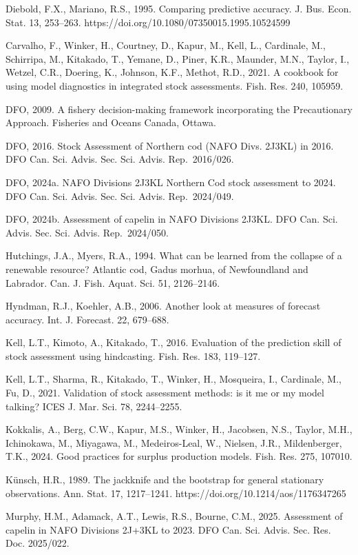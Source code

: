 \documentclass[11pt]{article}
\begin{document}
Diebold, F.X., Mariano, R.S., 1995. Comparing predictive accuracy. J.
Bus. Econ. Stat. 13, 253--263.
https://doi.org/10.1080/07350015.1995.10524599

Carvalho, F., Winker, H., Courtney, D., Kapur, M., Kell, L., Cardinale,
M., Schirripa, M., Kitakado, T., Yemane, D., Piner, K.R., Maunder, M.N.,
Taylor, I., Wetzel, C.R., Doering, K., Johnson, K.F., Methot, R.D.,
2021. A cookbook for using model diagnostics in integrated stock
assessments. Fish. Res. 240, 105959.

DFO, 2009. A fishery decision-making framework incorporating the
Precautionary Approach. Fisheries and Oceans Canada, Ottawa.

DFO, 2016. Stock Assessment of Northern cod (NAFO Divs. 2J3KL) in 2016.
DFO Can. Sci. Advis. Sec. Sci. Advis. Rep.~2016/026.

DFO, 2024a. NAFO Divisions 2J3KL Northern Cod stock assessment to 2024.
DFO Can. Sci. Advis. Sec. Sci. Advis. Rep.~2024/049.

DFO, 2024b. Assessment of capelin in NAFO Divisions 2J3KL. DFO Can. Sci.
Advis. Sec. Sci. Advis. Rep.~2024/050.

Hutchings, J.A., Myers, R.A., 1994. What can be learned from the
collapse of a renewable resource? Atlantic cod, Gadus morhua, of
Newfoundland and Labrador. Can. J. Fish. Aquat. Sci. 51, 2126--2146.

Hyndman, R.J., Koehler, A.B., 2006. Another look at measures of forecast
accuracy. Int. J. Forecast. 22, 679--688.

Kell, L.T., Kimoto, A., Kitakado, T., 2016. Evaluation of the prediction
skill of stock assessment using hindcasting. Fish. Res. 183, 119--127.

Kell, L.T., Sharma, R., Kitakado, T., Winker, H., Mosqueira, I.,
Cardinale, M., Fu, D., 2021. Validation of stock assessment methods: is
it me or my model talking? ICES J. Mar. Sci. 78, 2244--2255.

Kokkalis, A., Berg, C.W., Kapur, M.S., Winker, H., Jacobsen, N.S.,
Taylor, M.H., Ichinokawa, M., Miyagawa, M., Medeiros-Leal, W., Nielsen,
J.R., Mildenberger, T.K., 2024. Good practices for surplus production
models. Fish. Res. 275, 107010.

K\"unsch, H.R., 1989. The jackknife and the bootstrap for general
stationary observations. Ann. Stat. 17, 1217--1241.
https://doi.org/10.1214/aos/1176347265

Murphy, H.M., Adamack, A.T., Lewis, R.S., Bourne, C.M., 2025. Assessment
of capelin in NAFO Divisions 2J+3KL to 2023. DFO Can. Sci. Advis. Sec.
Res. Doc. 2025/022.
\end{document}
